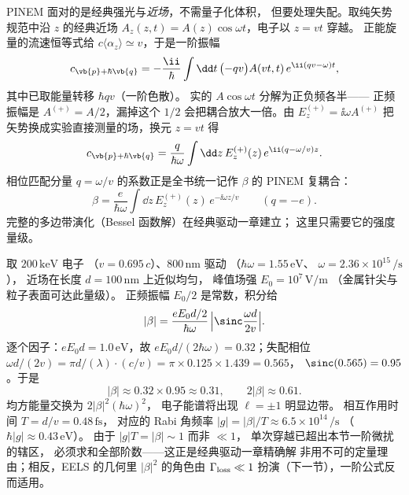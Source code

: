 PINEM 面对的是经典强光与\emph{近场}，不需量子化体积，
但要处理失配。取纯矢势规范中沿 \(z\) 的经典近场
\(A_z(z,t)=A(z)\cos\omega t\)，电子以 \(z=vt\) 穿越。
正能旋量的流速恒等式给
\(c\langle\alpha_z\rangle\simeq v\)，于是一阶振幅
\[
c_{\vb{p}+\hbar\vb{q}}
=-\frac{\ii}{\hbar}\int\dd t\,
\bigl(-qv\bigr)A(vt,t)\,
e^{\ii(qv-\omega)t},
\]
其中已取能量转移 \(\hbar qv\)（一阶色散）。
实的 \(A\cos\omega t\) 分解为正负频各半——
正频振幅是 \(A^{(+)}=A/2\)，漏掉这个 \(1/2\)
会把耦合放大一倍。由 \(E_z^{(+)}=\ii\omega A^{(+)}\)
把矢势换成实验直接测量的场，换元 \(z=vt\) 得
\[
c_{\vb{p}+\hbar\vb{q}}
=\frac{q}{\hbar\omega}\int\dd z\,
E_z^{(+)}(z)\,e^{\ii(q-\omega/v)z}.
\]
相位匹配分量 \(q=\omega/v\) 的系数正是全书统一记作
\(\beta\) 的 PINEM 复耦合：
\begin{equation}
\beta=\frac{e}{\hbar\omega}\int\dd z\,
E_z^{(+)}(z)\,e^{-\ii\omega z/v}
\qquad(q=-e).
\label{eq:feqo-pinem-beta-from-matrix-element}
\end{equation}
完整的多边带演化（Bessel 函数解）在经典驱动一章建立；
这里只需要它的强度量级。

\begin{example}[近场耦合的数值估计]
取 \(200\,\si{\kilo\electronvolt}\) 电子
（\(v=0.695\,c\)）、\(800\,\si{\nano\metre}\) 驱动
（\(\hbar\omega=1.55\,\si{\electronvolt}\)、
\(\omega=2.36\times10^{15}\,\si{\per\second}\)），
近场在长度 \(d=100\,\si{\nano\metre}\) 上近似均匀，
峰值场强 \(E_0=10^{7}\,\si{\volt\per\metre}\)
（金属针尖与粒子表面可达此量级）。
正频振幅 \(E_0/2\) 是常数，积分给
\[
|\beta|=\frac{eE_0d/2}{\hbar\omega}\,
\Bigl|\sinc\frac{\omega d}{2v}\Bigr|.
\]
逐个因子：\(eE_0d=1.0\,\si{\electronvolt}\)，故
\(eE_0d/(2\hbar\omega)=0.32\)；失配相位
\(\omega d/(2v)=\pi d/(\lambda)\cdot(c/v)
=\pi\times0.125\times1.439=0.565\)，
\(\sinc(0.565)=0.95\)。于是
\[
|\beta|\approx0.32\times0.95\approx0.31,\qquad
2|\beta|\approx0.61 .
\]
均方能量交换为 \(2|\beta|^2(\hbar\omega)^2\)，
电子能谱将出现 \(\ell=\pm1\) 明显边带。
相互作用时间 \(T=d/v=0.48\,\si{\femto\second}\)，
对应的 Rabi 角频率
\(|g|=|\beta|/T\approx6.5\times10^{14}\,\si{\per\second}\)
（\(\hbar|g|\approx0.43\,\si{\electronvolt}\)）。
由于 \(|g|T=|\beta|\sim1\) 而非 \(\ll1\)，
单次穿越已超出本节一阶微扰的辖区，
必须求和全部阶数——这正是经典驱动一章精确解
非用不可的定量理由；相反，EELS 的几何里
\(|\beta|^2\) 的角色由 \(\Gamma_{\rm loss}\ll1\)
扮演（下一节），一阶公式反而适用。
\end{example}






